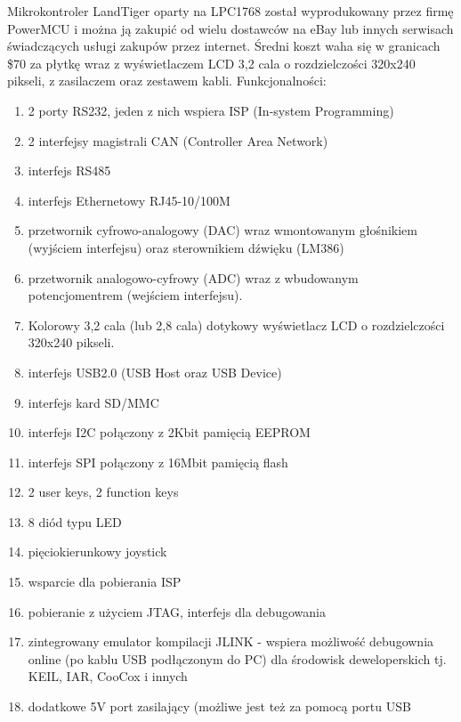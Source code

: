 \documentclass{BscUS}
\begin{document}
Mikrokontroler LandTiger oparty na LPC1768 został wyprodukowany przez firmę PowerMCU i można ją zakupić od wielu dostawców na eBay lub innych serwisach świadczących usługi zakupów przez internet. Średni koszt waha się w granicach \$70 za płytkę wraz z wyświetlaczem LCD 3,2 cala o rozdzielczości 320x240 pikseli, z zasilaczem oraz zestawem kabli.
\newline
Funkcjonalności:
\begin{enumerate} [label=(\alph*)]
\item 2 porty RS232, jeden z nich wspiera ISP (In-system Programming)
\item 2 interfejsy magistrali CAN (Controller Area Network)
\item interfejs RS485
\item interfejs Ethernetowy RJ45-10/100M 
\item przetwornik cyfrowo-analogowy (DAC) wraz wmontowanym głośnikiem (wyjściem interfejsu) oraz sterownikiem dźwięku (LM386)
\item przetwornik analogowo-cyfrowy (ADC) wraz z wbudowanym potencjomentrem (wejściem interfejsu).
\item Kolorowy 3,2 cala (lub 2,8 cala) dotykowy wyświetlacz LCD o rozdzielczości 320x240 pikseli. 
\item interfejs USB2.0 (USB Host oraz USB Device)
\item interfejs kard SD/MMC
\item interfejs I2C połączony z 2Kbit pamięcią EEPROM
\item interfejs SPI połączony z 16Mbit pamięcią flash
\item 2 user keys, 2 function keys
\item 8 diód typu LED
\item pięciokierunkowy joystick
\item wsparcie dla pobierania ISP
\item pobieranie z użyciem JTAG, interfejs dla debugowania
\item zintegrowany emulator kompilacji JLINK - wspiera możliwość debugownia online (po kablu USB podłączonym do PC) dla środowisk deweloperskich tj. KEIL, IAR, CooCox i innych
\item dodatkowe 5V port zasilający (możliwe jest też za pomocą portu USB 
\end{enumerate}
\end{document}
